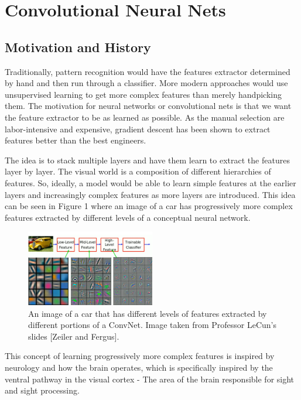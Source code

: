 \chapter{Convolutional Neural Nets}

\section{Motivation and History}

Traditionally, pattern recognition would have the features extractor determined by hand and then run through a classifier. More modern approaches would use unsupervised learning to get more complex features than merely handpicking them. The motivation for neural networks or convolutional nets is that we want the feature extractor to be as learned as possible. As the manual selection are labor-intensive and expensive, gradient descent has been shown to extract features better than the best engineers.

The idea is to stack multiple layers and have them learn to extract the features layer by layer. The visual world is a composition of different hierarchies of features. So, ideally, a model would be able to learn simple features at the earlier layers and increasingly complex features as more layers are introduced. This idea can be seen in Figure 1 where an image of a car has progressively more complex features extracted by different levels of a conceptual neural network.

\begin{figure}[ht]
\centering
\includegraphics[width=0.5\textwidth]{figs/FeatureExtraction.png}
\caption{An image of a car that has different levels of features extracted by different portions of a ConvNet.
Image taken from Professor LeCun's slides [Zeiler and Fergus].}
\end{figure}

This concept of learning progressively more complex features is inspired by neurology and how the brain operates, which is specifically inspired by the ventral pathway in the visual cortex - The area of the brain responsible for sight and sight processing.

